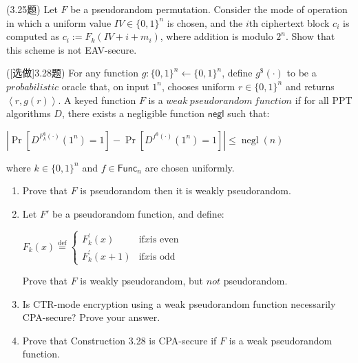 \begin{questions}
        \begin{solution}
        \end{solution}

    \question (3.25题) Let $F$ be a pseudorandom permutation. Consider the mode of operation in which a uniform value $IV\in\{0,1\}^n$ is chosen, and the $i$th ciphertext block $c_i$ is computed as $c_i:=F_k(IV+i+m_i)$, where addition is modulo $2^n$. Show that this scheme is not EAV-secure.

        \begin{solution}
        \end{solution}

    \question ([选做]3.28题) For any function $g:\{0,1\}^n\leftarrow\{0,1\}^n$, define $g^\text{\$}(\cdot)$ to be a $probabilistic$ oracle that, on input $1^n$, chooses uniform $r\in\{0,1\}^n$ and returns $\left\langle{r,g(r)}\right\rangle$. A keyed function $F$ is a $weak\ pseudorandom\ function$ if for all PPT algorithms $D$, there exists a negligible function $\textsf{negl}$ such that:

        \begin{center}
            $\left|\operatorname{Pr}\left[D^{F_{k}^{\$}(\cdot)}\left(1^{n}\right)=1\right]-\operatorname{Pr}\left[D^{f^{\$}(\cdot)}\left(1^{n}\right)=1\right]\right|\leq\operatorname{negl}(n)$
        \end{center}

        where $k\in\{0,1\}^n$ and $f\in\textsf{Func}_n$ are chosen uniformly.

        \begin{enumerate}
            \item Prove that $F$ is pseudorandom then it is weakly pseudorandom.
            \item Let $F'$ be a pseudorandom function, and define:
                \begin{center}
                    $F_{k}(x)\stackrel{\text{def}}{=}\left\{\begin{array}{cl}F_{k}^{\prime}(x)&\text{if}x\text{is even}\\F_{k}^{\prime}(x+1)&\text{if}x\text{is odd}\end{array}\right.$
                \end{center}
                Prove that $F$ is weakly pseudorandom, but $not$ pseudorandom.
            \item Is CTR-mode encryption using a weak pseudorandom function necessarily CPA-secure? Prove your answer.
            \item Prove that Construction 3.28 is CPA-secure if $F$ is a weak pseudorandom function.
        \end{enumerate}


\end{questions}
